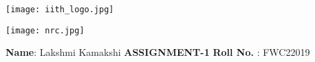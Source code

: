 \documentclass[10pt,a4paper]{report}
\begin{document}
\begin{figure*}[!tbp]
  \centering
  \begin{minipage}[b]{0.4\textwidth}
    \texttt{[image: iith\_logo.jpg]}
  \end{minipage}
  \hfill
  \begin{minipage}[b]{0.4\textwidth}
\raggedleft  \texttt{[image: nrc.jpg]}
 
  \end{minipage}
\end{figure*}


\raggedright \textbf{Name}:\hspace{1mm} Lakshmi Kamakshi\hspace{3cm} \Large \textbf{ASSIGNMENT-1}\hspace{2.5cm} %
\normalsize \textbf{Roll No.} :\hspace{1mm} FWC22019\vspace{2cm}
\end{document}
